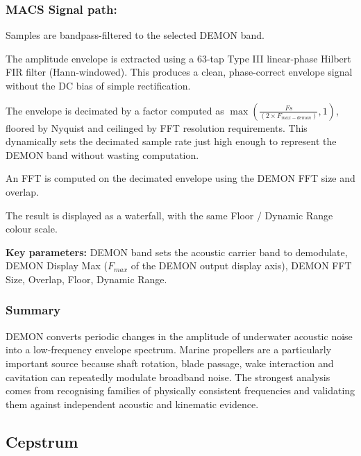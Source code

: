 \subsubsection{MACS Signal path:}

\begin{compactenum}
    \item Samples are bandpass-filtered to the selected DEMON band.
    \item The amplitude envelope is extracted using a 63-tap Type III linear-phase Hilbert FIR filter (Hann-windowed). This produces a clean, phase-correct envelope signal without the DC bias of simple rectification.
    \item The envelope is decimated by a factor computed as $\max(\frac{Fs}{(2 \times F_{max-demon})}, 1)$, floored by Nyquist and ceilinged by FFT resolution requirements. This dynamically sets the decimated sample rate just high enough to represent the DEMON band without wasting computation.
    \item An FFT is computed on the decimated envelope using the DEMON FFT size and overlap.
    \item The result is displayed as a waterfall, with the same Floor / Dynamic Range colour scale.
\end{compactenum}

\textbf{Key parameters:} DEMON band sets the acoustic carrier band to demodulate, DEMON Display Max ($F_{max}$ of the DEMON output display axis), DEMON FFT Size, Overlap, Floor, Dynamic Range.

\subsubsection{Summary}

\begin{learnpoint}
    DEMON converts periodic changes in the amplitude of underwater acoustic noise into a low-frequency envelope spectrum. Marine propellers are a particularly important source because shaft rotation, blade passage, wake interaction and cavitation can repeatedly modulate broadband noise. The strongest analysis comes from recognising families of physically consistent frequencies and validating them against independent acoustic and kinematic evidence.
\end{learnpoint}

\subsection{Cepstrum}

